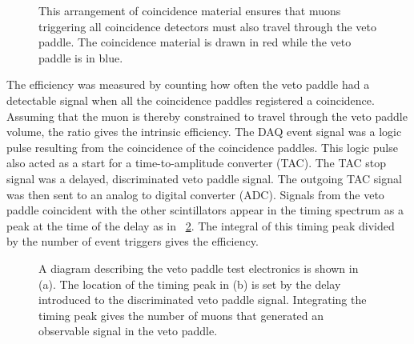 \begin{figure}[!htbp]
\caption{This arrangement of coincidence material ensures that muons triggering all coincidence detectors must also travel through the veto paddle.  The coincidence material is drawn in red while the veto paddle is in blue.}
\label{fig:efficiencyTest}
\end{figure}

The efficiency was measured by counting how often the veto paddle had a detectable signal when all the coincidence paddles registered a coincidence.  Assuming that the muon is thereby constrained to travel through the veto paddle volume, the ratio gives the intrinsic efficiency.  The DAQ event signal was a logic pulse resulting from the coincidence of the coincidence paddles.  This logic pulse also acted as a start for a time-to-amplitude converter (TAC).  The TAC stop signal was a delayed, discriminated veto paddle signal.  The outgoing TAC signal was then sent to an analog to digital converter (ADC).  Signals from the veto paddle coincident with the other scintillators appear in the timing spectrum as a peak at the time of the delay as in {\fig}~\ref{fig:vetoTestElectronics}.  The integral of this timing peak divided by the number of event triggers gives the efficiency.
\begin{figure}[!htbp]
\centering
{}
\caption{A diagram describing the veto paddle test electronics is shown in (a).  The location of the timing peak in (b) is set by the delay introduced to the discriminated veto paddle signal.  Integrating the timing peak gives the number of muons that generated an observable signal in the veto paddle.}
\label{fig:vetoTestElectronics}
\end{figure}


